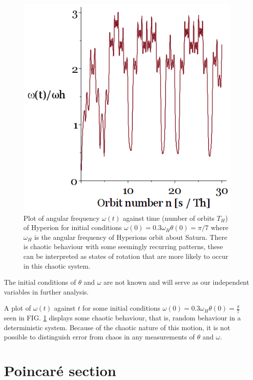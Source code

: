 \documentclass[10pt, twocolumn]{article} %
\begin{document}
\begin{figure}[tb!]
\centering
\includegraphics[width=0.95\columnwidth]{angular_freq_chaos.png}
  \caption{Plot of angular frequency $\omega(t)$ against time (number of orbits $T_H$) of Hyperion for initial conditions $\omega(0) = 0.3\omega_H \theta(0) = \pi/7$ where $\omega_H$ is the angular frequency of Hyperions orbit about Saturn. There is chaotic behaviour with some seemingly recurring patterns, these can be interpreted as states of rotation that are more likely to occur in this chaotic system.}
\label{angular_freq_chaos}
\end{figure}

The initial conditions of $\theta$ and $\omega$ are not known and will serve as our independent variables in further analysis.

A plot of $\omega(t)$ against $t$ for some initial conditions $\omega(0) = 0.3\omega_H \theta(0) = \frac{\pi}{7}$ seen in FIG. \ref{angular_freq_chaos} displays some chaotic behaviour, that is, random behaviour in a deterministic system. Because of the chaotic nature of this motion, it is not possible to distinguish error from chaos in any measurements of $\theta$ and $\omega$.

\section*{Poincar\'e section}
\end{document}
